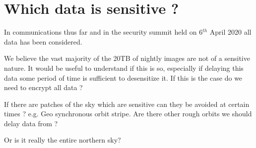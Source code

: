 \section{Which data is sensitive ?} \label{sec:which}

In communications thus far and in the security summit held on 6$^{th}$ April 2020 all data has been considered.

We believe the vast majority of the 20TB of nightly images are not of a sensitive nature.
It would be useful to understand if this is so, especially if delaying this data some period of time is sufficient to desensitize it. If this is the case do we need to encrypt all data ?

If there are patches of the sky which are sensitive can they be avoided at certain times ? e.g. Geo synchronous orbit stripe.
Are there other rough orbits we should delay data from ?

Or is it really the entire northern sky?

